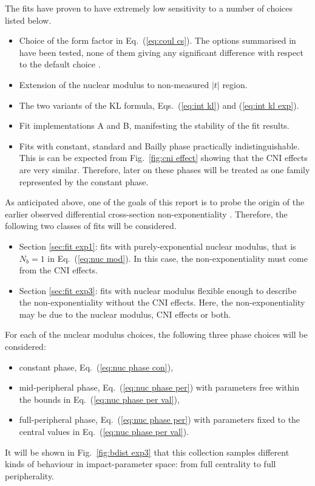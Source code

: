 The fits have proven to have extremely low sensitivity to a number of choices listed below.
\begin{itemize}
\item Choice of the form factor in Eq.~(\ref{eq:coul cs}). The options summarised in \cite{elegent} have been tested, none of them giving any significant difference with respect to the default choice \cite{puckett10}.
\item Extension of the nuclear modulus to non-measured $|t|$ region. 
\item The two variants of the KL formula, Eqs.~(\ref{eq:int kl}) and (\ref{eq:int kl exp}).
\item Fit implementations A and B, manifesting the stability of the fit results.
\item Fits with constant, standard and Bailly phase practically indistinguishable. This is can be expected from Fig.~\ref{fig:cni effect} showing that the CNI effects are very similar. Therefore, later on these phases will be treated as one family represented by the constant phase.
\end{itemize}


As anticipated above, one of the goals of this report is to probe the origin of the earlier observed differential cross-section non-exponentiality \cite{8tev-90m}. Therefore, the following two classes of fits will be considered.
\begin{itemize}
\item Section \ref{sec:fit exp1}: fits with purely-exponential nuclear modulus, that is $N_b=1$ in Eq.~(\ref{eq:nuc mod}). In this case, the non-exponentiality must come from the CNI effects.
\item Section \ref{sec:fit exp3}: fits with nuclear modulus flexible enough to describe the non-exponentiality without the CNI effects. Here, the non-exponentiality may be due to the nuclear modulus, CNI effects or both.
\end{itemize}


For each of the nuclear modulus choices, the following three phase choices will be considered:
\begin{itemize}\setlength\itemsep{0pt}
\item constant phase, Eq.~(\ref{eq:nuc phase con}),
\item mid-peripheral phase, Eq.~(\ref{eq:nuc phase per}) with parameters free within the bounds in Eq.~(\ref{eq:nuc phase per val}),
\item full-peripheral phase, Eq.~(\ref{eq:nuc phase per}) with parameters fixed to the central values in Eq.~(\ref{eq:nuc phase per val}).
\end{itemize}
It will be shown in Fig.~\ref{fig:bdist exp3} that this collection samples different kinds of behaviour in impact-parameter space: from full centrality to full peripherality.


